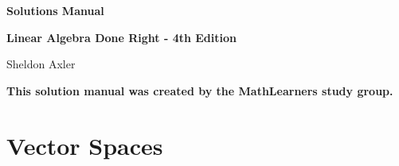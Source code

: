 \documentclass[11pt, b5paper, draft, fleqn]{book}
\theoremstyle{remark}
\theoremstyle{definition}
\begin{document}
\begin{titlepage}	
	\begin{center}
	
	\huge
	\textbf{Solutions Manual}
    
	\vspace{2em}
	\Large
	\textbf{Linear Algebra Done Right - 4th Edition}
    
	Sheldon Axler
	
	\vspace{2em}
	\large
	\textbf{This solution manual was created by the MathLearners study group.}
	
	\end{center}
\end{titlepage}

\fancyhf{}
\cleardoublepage
{}
\setcounter{page}{3}
\tableofcontents

\cleardoublepage

\fancyhf{}
\setcounter{page}{5}
\rhead{\thepage}
\lhead{\firstleftmark}
\sloppy

\chapter{Vector Spaces}
\end{document}
